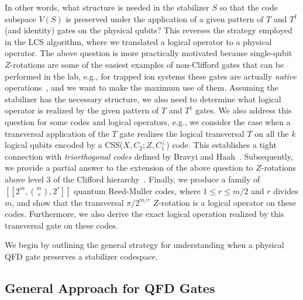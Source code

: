 \documentclass[twoside,romanappendices]{IEEEtran}
\newcommand{\llbr}{[\![}
\newcommand{\rrbr}{]\!]}
\begin{document}
In other words, what structure is needed in the stabilizer $S$ so that the code subspace $V(S)$ is preserved under the application of a given pattern of $T$ and $T^{\dagger}$ (and identity) gates on the physical qubits?
This reverses the strategy employed in the LCS algorithm, where we translated a logical operator to a physical operator. 
The above question is more practically motivated because single-qubit $Z$-rotations are some of the easiest examples of non-Clifford gates that can be performed in the lab, e.g., for trapped ion systems these gates are actually \emph{native} operations~\cite{Linke-nas17}, and we want to make the maximum use of them.
Assuming the stabilizer has the necessary structure, we also need to determine what logical operator is realized by the given pattern of $T$ and $T^{\dagger}$ gates.
We also address this question for some codes and logical operators, e.g., we consider the case when a transversal application of the $T$ gate realizes the logical transversal $T$ on all the $k$ logical qubits encoded by a CSS($X,C_2 ; Z, C_1^{\perp}$) code.
This establishes a tight connection with \emph{triorthogonal codes} defined by Bravyi and Haah~\cite{Bravyi-pra12}. 
Subsequently, we provide a partial answer to the extension of the above question to $Z$-rotations above level $3$ of the Clifford hierarchy~\cite{Landahl-arxiv13,Haah-quantum17b,Campbell-pra17,Campbell-prl17,Vuillot-arxiv19}.
Finally, we produce a family of $\llbr 2^m, \binom{m}{r}, 2^r \rrbr$ quantum Reed-Muller codes, where $1 \leq r \leq m/2$ and $r$ divides $m$, and show that the transversal $\pi/2^{m/r}$ $Z$-rotation is a logical operator on these codes.
Furthermore, we also derive the exact logical operation realized by this transversal gate on these codes.

We begin by outlining the general strategy for understanding when a physical QFD gate preserves a stabilizer codespace.



\subsection{General Approach for QFD Gates}
\label{sec:general_QFD}
\end{document}
